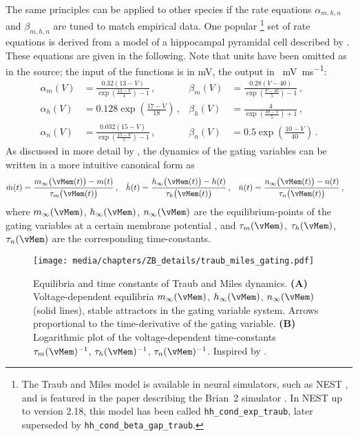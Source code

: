 The same principles can be applied to other species if the rate equations $\alpha_{m, h, n}$ and $\beta_{m, h, n}$ are tuned to match empirical data.
One popular%
\footnote{The Traub and Miles model is available in neural simulators, such as NEST \citep{gewaltig2007nest}, and is featured in the paper describing the Brian~2 simulator \citep{stimberg2019brian}. In NEST up to version 2.18, this model has been called \texttt{hh\_cond\_exp\_traub}, later superseded by \texttt{hh\_cond\_beta\_gap\_traub}.}
set of rate equations is derived from a model of a hippocampal pyramidal cell described by \citet[Chapter 4, p.~92-94]{traub1991neuronal}.
These equations are given in the following.
Note that units have been omitted as in the source; the input of the functions is in \si{\milli\volt}, the output in \si{\per\milli\volt\per\milli\second}:
\begin{align*}
	\alpha_m(V) &= \frac{0.32(13 - V)}{\exp\left(\frac{13 - V}{4}\right) - 1} \,, &
	\beta_m(V) &= \frac{0.28(V - 40)}{\exp\left(\frac{V - 40}{5}\right) - 1} \,, \\
	\alpha_h(V) &= 0.128 \exp\left( \frac{17 - V}{18}\right) \,, &
	\beta_h(V) &= \frac{4}{ \exp\left( \frac{40 - V}{5}\right) + 1 } \,, \\
	\alpha_n(V) &= \frac{0.032(15 - V)}{\exp\left(\frac{15 - V}{5}\right) - 1} \,, &
	\beta_n(V) &= 0.5 \exp\left(\frac{10 - V}{40}\right) \,.
\end{align*}
As discussed in more detail by \citet[Chapter~2.3]{izhikevich2007dynamical}, the dynamics of the gating variables can be written in a more intuitive canonical form as
\begin{align*}
	\dot m(t) &= \frac{m_\infty\bigl(\vMem(t)\bigr) - m(t)}{\tau_m\bigl(\vMem(t)\bigr)} \,, &
	\dot h(t) &= \frac{h_\infty\bigl(\vMem(t)\bigr) - h(t)}{\tau_h\bigl(\vMem(t)\bigr)} \,, &
	\dot n(t) &= \frac{n_\infty\bigl(\vMem(t)\bigr) - n(t)}{\tau_n\bigl(\vMem(t)\bigr)} \,,
\end{align*}
where $m_\infty(\vMem)$, $h_\infty(\vMem)$, $n_\infty(\vMem)$ are the equilibrium-points of the gating variables at a certain membrane potential \vMem, and $\tau_m(\vMem)$, $\tau_h(\vMem)$, $\tau_n(\vMem)$ are the corresponding time-constants.

\begin{figure}[t]
	\centering
	\texttt{[image: media/chapters/ZB\_details/traub\_miles\_gating.pdf]}%
	{\label{fig:traub_miles_gating_equilibrium}}%
	{\label{fig:traub_miles_gating_time_constants}}%
	\caption[Equilibria and time constants of the Traub and Miles dynamics]{Equilibria and time constants of Traub and Miles dynamics. \textbf{(A)} Voltage-dependent equilibria $m_\infty(\vMem)$, $h_\infty(\vMem)$, $n_\infty(\vMem)$ (solid lines), stable attractors in the gating variable system.
	Arrows proportional to the time-derivative of the gating variable. \textbf{(B)} Logarithmic plot of the voltage-dependent time-constants $\tau_m(\vMem)^{-1}$, $\tau_h(\vMem)^{-1}$, $\tau_n(\vMem)^{-1}$. Inspired by \citet[Figure~2.13, p.~39]{izhikevich2007dynamical}.	}
	\label{fig:traub_miles}
\end{figure} 

